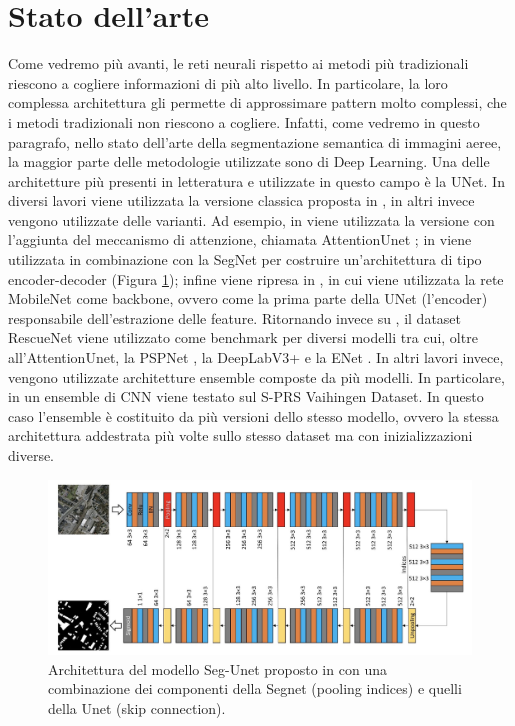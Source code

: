 \section{Stato dell'arte}
\label{stato_dell'arte}

Come vedremo più avanti, le reti neurali rispetto ai metodi più tradizionali riescono a cogliere informazioni di più alto livello. In particolare, la loro complessa architettura gli permette di approssimare pattern molto complessi, che i metodi tradizionali non riescono a cogliere. Infatti, come vedremo in questo paragrafo, nello stato dell'arte della segmentazione semantica di immagini aeree, la maggior parte delle metodologie utilizzate sono di Deep Learning.
Una delle architetture più presenti in letteratura e utilizzate in questo campo è la UNet. In diversi lavori \cite{safe_landing, uavid, kattenborn2019convolutional} viene utilizzata la versione classica proposta in \cite{unet}, in altri invece vengono utilizzate delle varianti. Ad esempio, in \cite{rescuenet} viene utilizzata la versione con l'aggiunta del meccanismo di attenzione, chiamata AttentionUnet \cite{attentionUnet}; in \cite{unet-segnet} viene utilizzata in combinazione con la SegNet \cite{segnet} per costruire un'architettura di tipo encoder-decoder (Figura \ref{fig:segnet-unet}); infine viene ripresa in \cite{real-time}, in cui viene utilizzata la rete MobileNet \cite{mobilenet} come backbone, ovvero come la prima parte della UNet (l'encoder) responsabile dell'estrazione delle feature. Ritornando invece su \cite{rescuenet}, il dataset RescueNet viene utilizzato come benchmark per diversi modelli tra cui, oltre all'AttentionUnet, la PSPNet \cite{pspnet}, la DeepLabV3+ \cite{deeplabv3+} e la ENet \cite{enet}. In altri lavori invece, vengono utilizzate architetture ensemble composte da più modelli. In particolare, in \cite{ensemble-cnns} un ensemble di CNN viene testato sul S-PRS Vaihingen Dataset. In questo caso l'ensemble è costituito da più versioni dello stesso modello, ovvero la stessa architettura addestrata più volte sullo stesso dataset  ma con inizializzazioni diverse. 


\begin{figure}[h!]
    \centering
    \hspace*{0in}
    \includegraphics[scale=0.39]{img/segnet+unet.png}
    \caption{Architettura del modello Seg-Unet proposto in \cite{unet-segnet} con una combinazione dei componenti della Segnet (pooling indices) e quelli della Unet (skip connection).}
    \label{fig:segnet-unet}
\end{figure}


